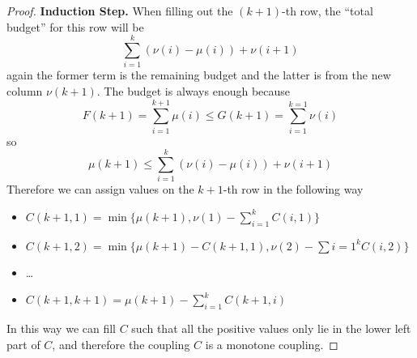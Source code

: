 \begin{proof}
            \textbf{Induction Step.} When filling out the $(k+1)$-th row, the ``total budget'' for this row will be
            \[ \sum_{i=1}^{k}(\nu(i) - \mu(i)) + \nu(i+1) \]
            again the former term is the remaining budget and the latter is from the new column $\nu(k+1)$. The budget is always enough because
            \[ F(k+1) = \sum_{i=1}^{k+1}\mu(i) \le G(k+1) = \sum_{i=1}^{k=1} \nu(i) \]
            so
            \[ \mu(k+1) \le \sum_{i=1}^{k}(\nu(i) - \mu(i)) + \nu(i+1) \]
            Therefore we can assign values on the $k+1$-th row in the following way
            \begin{itemize}
                \item $C(k+1, 1) = \min\{ \mu(k+1), \nu(1) - \sum_{i=1}^k C(i,1) \}$
                \item $C(k+1, 2) = \min\{ \mu(k+1) - C(k+1,1), \nu(2)-\sum{i=1}^k C(i,2) \}$
                \item \dots
                \item $C(k+1, k+1) = \mu(k+1) - \sum_{i=1}^k C(k+1, i)$
            \end{itemize}
            In this way we can fill $C$ such that all the positive values only lie in the lower left part of $C$, and therefore the coupling $C$ is a monotone coupling.
        \end{proof}

